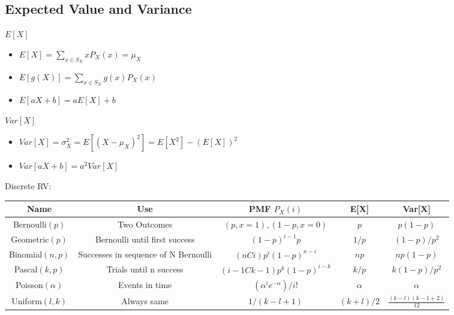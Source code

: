 \documentclass{article}
\theoremstyle{remark}
\begin{document}
\begin{multicols*}{2}
    \subsection{Expected Value and Variance}
    \(E[X]\)
    \begin{itemize}
        \item \(E[X] = \sum_{x\in S_X} xP_X(x) = \mu_X\)
        \item \(E[g(X)] = \sum_{x\in S_X} g(x) P_X(x) \)
        \item \(E[aX + b] = a E[X] + b\)
    \end{itemize}
    \(Var[X]\)
    \begin{itemize}
        \item \(Var[X] = \sigma^2_X = E[{(X-\mu_X)}^2] = E[X^2] - {(E[X])}^2\)
        \item \(Var[aX+b] = a^2 Var[X]\)
    \end{itemize}
\end{multicols*}

Discrete RV:\@
\begin{table}[!htbp]
    \centering
    \begin{tabular}{ c c c c c }
        \toprule
        Name                & Use                                  & PMF \(P_X(i)\)                      & E[X]        & Var[X]                      \\
        \midrule
        Bernoulli\((p)\)    & Two Outcomes                         & \((p, x=1),(1-p, x=0)\)             & \(p\)       & \(p(1-p)\)                  \\
        Geometric\((p)\)    & Bernoulli until first success        & \({(1-p)}^{i-1}p\)                  & \(1/p\)     & \((1-p)/p^2\)               \\
        Binomial\((n, p)\)  & Successes in sequence of N Bernoulli & \((nCi) p^i {(1-p)}^{n-i}\)         & \(np\)      & \(np(1-p)\)                 \\
        Pascal\((k,p)\)     & Trials until n success               & \((i - 1 C k-1) p^k {(1-p)}^{i-k}\) & \(k/p\)     & \(k(1-p)/p^2\)              \\
        Poisson\((\alpha)\) & Events in time                       & \( (\alpha ^i e^{-\alpha})/i! \)    & \(\alpha \) & \(\alpha \)                 \\
        Uniform\((l,k)\)    & Always same                          & \(1/(k-l + 1)\)                     & \((k+l)/2\) & \(\frac{(k-l)(k-1+2)}{12}\) \\
        \bottomrule
    \end{tabular}
\end{table}
\end{document}
